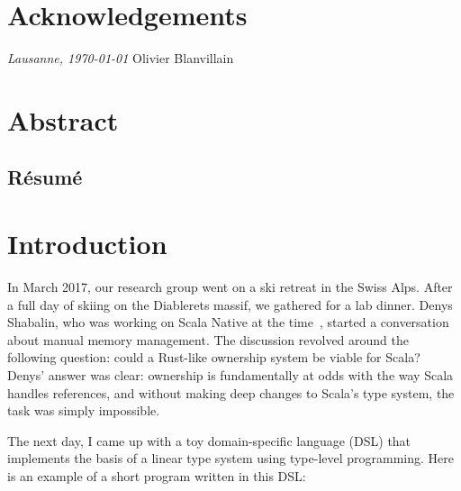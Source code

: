 



\frontmatter

\setcounter{page}{0}

\chapter{Acknowledgements}
\lipsum[1-2]

\bigskip
\noindent\textit{Lausanne, \today}
\hfill Olivier Blanvillain

\cleardoublepage
\chapter*{Abstract}
\lipsum[1-2] %
\begin{otherlanguage}{french}
\cleardoublepage
\chapter*{Résumé}
\lipsum[1-2]
\end{otherlanguage}

\hypersetup{linkcolor=black}
\tableofcontents
\cleardoublepage
{}
{}
\listoffigures
\hypersetup{linkcolor=purplish}
\mainmatter


\chapter{Introduction}
\label{chap:introduction}

In March 2017, our research group went on a ski retreat in the Swiss Alps.
After a full day of skiing on the Diablerets massif, we gathered for a lab dinner.
Denys Shabalin, who was working on Scala Native at the time~\citep{shabalin2020just}, started a conversation about manual memory management.
The discussion revolved around the following question: could a Rust-like ownership system be viable for Scala?
Denys' answer was clear: ownership is fundamentally at odds with the way Scala handles references, and without making deep changes to Scala's type system, the task was simply impossible.

The next day, I came up with a toy domain-specific language (DSL) that implements the basis of a linear type system using type-level programming.
Here is an example of a short program written in this DSL:


